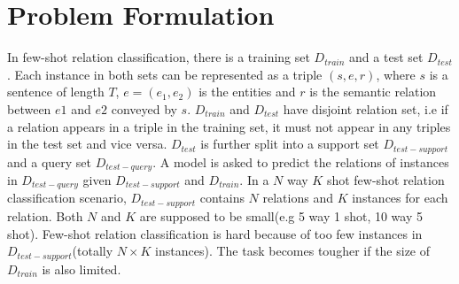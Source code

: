 \section{Problem Formulation}
In few-shot relation classification, there is a training set $D_{train}$ and a test set $D_{test}$. Each instance in both sets can be represented as a triple $(s,e,r)$, where $s$ is a sentence of length $T$, $e=(e_1, e_2)$ is the entities and $r$ is the semantic relation between $e1$ and $e2$ conveyed by $s$.
$D_{train}$ and $D_{test}$ have disjoint relation set, i.e if a relation appears in a triple in the training set, it must not appear in any triples in the test set and vice versa.
$D_{test}$ is further split into a support set $D_{test-support}$ and a query set $D_{test-query}$. A model is asked to predict the relations of instances in $D_{test-query}$ given $D_{test-support}$ and $D_{train}$.
In a $N$ way $K$ shot few-shot relation classification scenario, $D_{test-support}$ contains $N$ relations and $K$ instances for each relation. Both $N$ and $K$ are supposed to be small(e.g 5 way 1 shot, 10 way 5 shot). Few-shot relation classification is hard because of too few instances in $D_{test-support}$(totally $N\times K$ instances).
The task becomes tougher if the size of $D_{train}$ is also limited.
